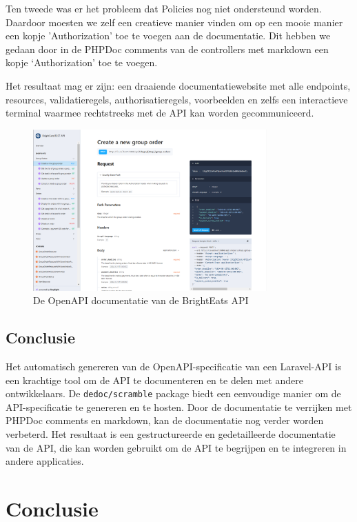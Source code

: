 \bigskip

Ten tweede was er het probleem dat Policies nog niet ondersteund worden. Daardoor moesten we zelf een creatieve manier vinden om op een mooie manier een kopje 'Authorization' toe te voegen aan de documentatie. Dit hebben we gedaan door in de PHPDoc comments van de controllers met markdown een kopje `Authorization' toe te voegen.

\bigskip

Het resultaat mag er zijn: een draaiende documentatiewebsite met alle endpoints, resources, validatieregels, authorisatieregels, voorbeelden en zelfs een interactieve terminal waarmee rechtstreeks met de API kan worden gecommuniceerd.

\begin{figure}[H]
\centering
\includegraphics[width=0.8\textwidth]{scramble.png}
\caption{De OpenAPI documentatie van de BrightEats API}
\label{fig:openapi}
\end{figure}

\subsection{Conclusie}

Het automatisch genereren van de OpenAPI-specificatie van een Laravel-API is een krachtige tool om de API te documenteren en te delen met andere ontwikkelaars. De \texttt{dedoc/scramble} package biedt een eenvoudige manier om de API-specificatie te genereren en te hosten. Door de documentatie te verrijken met PHPDoc comments en markdown, kan de documentatie nog verder worden verbeterd. Het resultaat is een gestructureerde en gedetailleerde documentatie van de API, die kan worden gebruikt om de API te begrijpen en te integreren in andere applicaties.

\section{Conclusie}

